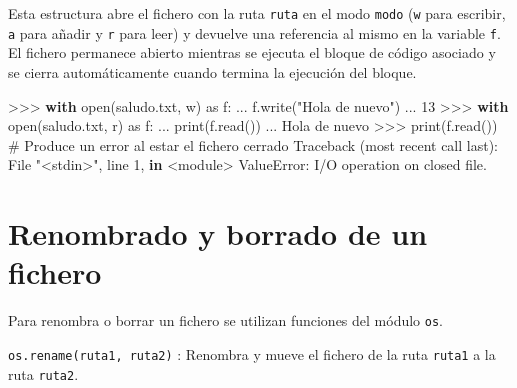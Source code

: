 \documentclass[
  spanish,
  a4paper,
]{scrreport}
\newenvironment{Shaded}{\begin{snugshade}}{\end{snugshade}}
\newcommand{\BuiltInTok}[1]{\textcolor[rgb]{0.00,0.23,0.31}{#1}}
\newcommand{\CommentTok}[1]{\textcolor[rgb]{0.37,0.37,0.37}{#1}}
\newcommand{\ControlFlowTok}[1]{\textcolor[rgb]{0.00,0.23,0.31}{\textbf{#1}}}
\newcommand{\DecValTok}[1]{\textcolor[rgb]{0.68,0.00,0.00}{#1}}
\newcommand{\ImportTok}[1]{\textcolor[rgb]{0.00,0.46,0.62}{#1}}
\newcommand{\KeywordTok}[1]{\textcolor[rgb]{0.00,0.23,0.31}{\textbf{#1}}}
\newcommand{\NormalTok}[1]{\textcolor[rgb]{0.00,0.23,0.31}{#1}}
\newcommand{\OperatorTok}[1]{\textcolor[rgb]{0.37,0.37,0.37}{#1}}
\newcommand{\PreprocessorTok}[1]{\textcolor[rgb]{0.68,0.00,0.00}{#1}}
\newcommand{\StringTok}[1]{\textcolor[rgb]{0.13,0.47,0.30}{#1}}
\begin{document}
Esta estructura abre el fichero con la ruta \texttt{ruta} en el modo
\texttt{modo} (\texttt{\textquotesingle{}w\textquotesingle{}} para
escribir, \texttt{\textquotesingle{}a\textquotesingle{}} para añadir y
\texttt{\textquotesingle{}r\textquotesingle{}} para leer) y devuelve una
referencia al mismo en la variable \texttt{f}. El fichero permanece
abierto mientras se ejecuta el bloque de código asociado y se cierra
automáticamente cuando termina la ejecución del bloque.

\begin{Shaded}
\begin{Highlighting}[]
\OperatorTok{\textgreater{}\textgreater{}\textgreater{}} \ControlFlowTok{with} \BuiltInTok{open}\NormalTok{(}\StringTok{\textquotesingle{}saludo.txt\textquotesingle{}}\NormalTok{, }\StringTok{\textquotesingle{}w\textquotesingle{}}\NormalTok{) }\ImportTok{as}\NormalTok{ f:}
\NormalTok{...     f.write(}\StringTok{"Hola de nuevo"}\NormalTok{)}
\NormalTok{... }
\DecValTok{13}
\OperatorTok{\textgreater{}\textgreater{}\textgreater{}} \ControlFlowTok{with} \BuiltInTok{open}\NormalTok{(}\StringTok{\textquotesingle{}saludo.txt\textquotesingle{}}\NormalTok{, }\StringTok{\textquotesingle{}r\textquotesingle{}}\NormalTok{) }\ImportTok{as}\NormalTok{ f:}
\NormalTok{...     }\BuiltInTok{print}\NormalTok{(f.read())}
\NormalTok{... }
\NormalTok{Hola de nuevo}
\OperatorTok{\textgreater{}\textgreater{}\textgreater{}} \BuiltInTok{print}\NormalTok{(f.read())  }\CommentTok{\# Produce un error al estar el fichero cerrado}
\NormalTok{Traceback (most recent call last):}
\NormalTok{  File }\StringTok{"\textless{}stdin\textgreater{}"}\NormalTok{, line }\DecValTok{1}\NormalTok{, }\KeywordTok{in} \OperatorTok{\textless{}}\NormalTok{module}\OperatorTok{\textgreater{}}
\PreprocessorTok{ValueError}\NormalTok{: I}\OperatorTok{/}\NormalTok{O operation on closed }\BuiltInTok{file}\NormalTok{.}
\end{Highlighting}
\end{Shaded}

\section{Renombrado y borrado de un
fichero}\label{renombrado-y-borrado-de-un-fichero}

Para renombra o borrar un fichero se utilizan funciones del módulo
\texttt{os}.

\texttt{os.rename(ruta1,\ ruta2)} : Renombra y mueve el fichero de la
ruta \texttt{ruta1} a la ruta \texttt{ruta2}.
\end{document}
